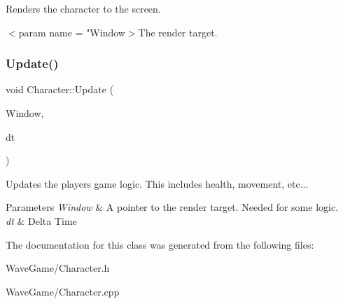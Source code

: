 Renders the character to the screen. 

$<$param name = "Window$>$The render target.\mbox{\label{class_character_a4a0a0f23c0a4c15a8c61069441093ef5}} 
\subsubsection{\texorpdfstring{Update()}{Update()}}
{\footnotesize\ttfamily void Character\+::\+Update (\begin{DoxyParamCaption}\item[{Render\+Window $\ast$}]{Window,  }\item[{float}]{dt }\end{DoxyParamCaption})}



Updates the players game logic. This includes health, movement, etc... 


\begin{DoxyParams}{Parameters}
{\em Window} & A pointer to the render target. Needed for some logic.\\
\hline
{\em dt} & Delta Time\\
\hline
\end{DoxyParams}


The documentation for this class was generated from the following files\+:\begin{DoxyCompactItemize}
\item 
Wave\+Game/Character.\+h\item 
Wave\+Game/Character.\+cpp\end{DoxyCompactItemize}
